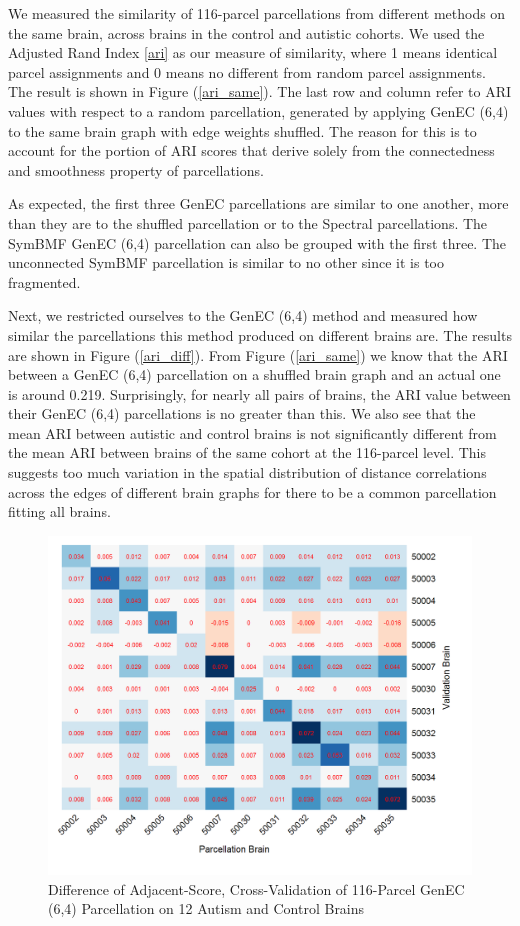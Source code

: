 We measured the similarity of 116-parcel parcellations from different
methods on the same brain, across brains in the control and autistic
cohorts. We used the Adjusted Rand Index \ref{ari} as our measure of
similarity, where 1 means identical parcel assignments and 0 means no
different from random parcel assignments. The result is shown in Figure
(\ref{ari_same}). The last row and column refer to ARI values with
respect to a random parcellation, generated by applying GenEC (6,4) to
the same brain graph with edge weights shuffled. The reason for this is
to account for the portion of ARI scores that derive solely from the
connectedness and smoothness property of parcellations.

As expected, the first three GenEC parcellations are similar to one
another, more than they are to the shuffled parcellation or to the
Spectral parcellations. The SymBMF GenEC (6,4) parcellation can also be
grouped with the first three. The unconnected SymBMF parcellation is
similar to no other since it is too fragmented.

Next, we restricted ourselves to the GenEC (6,4) method and measured
how similar the parcellations this method produced on different brains
are. The results are shown in Figure (\ref{ari_diff}). From Figure
(\ref{ari_same}) we know that the ARI between a GenEC (6,4) parcellation
on a shuffled brain graph and an actual one is around 0.219.
Surprisingly, for nearly all pairs of brains, the ARI value between
their GenEC (6,4) parcellations is no greater than this. We also see
that the mean ARI between autistic and control brains is not
significantly different from the mean ARI between brains of the same
cohort at the 116-parcel level. This suggests too much variation in the
spatial distribution of distance correlations across the edges of
different brain graphs for there to be a common parcellation fitting
all brains.

\begin{figure}
\caption{Difference of Adjacent-Score, Cross-Validation of 116-Parcel
GenEC (6,4) Parcellation on 12 Autism and Control Brains}
\label{cv_ec}
\includegraphics[scale = 1]{figs/8_cv_ec.png}
\end{figure}

